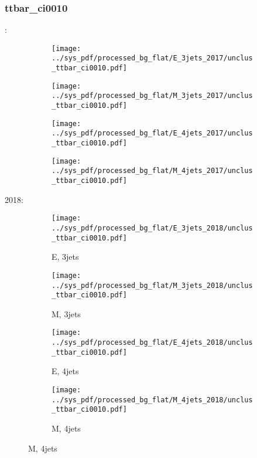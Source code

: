 \documentclass{beamer}
\begin{document}
\begin{frame}
\frametitle{ttbar_ci0010}
\fontsize{5}{1}:
\begin{figure}
\centering
\begin{subfigure}[b]{0.24\textwidth}
\texttt{[image: ../sys\_pdf/processed\_bg\_flat/E\_3jets\_2017/unclus\_ttbar\_ci0010.pdf]}
\end{subfigure}
\begin{subfigure}[b]{0.24\textwidth}
\texttt{[image: ../sys\_pdf/processed\_bg\_flat/M\_3jets\_2017/unclus\_ttbar\_ci0010.pdf]}
\end{subfigure}
\begin{subfigure}[b]{0.24\textwidth}
\texttt{[image: ../sys\_pdf/processed\_bg\_flat/E\_4jets\_2017/unclus\_ttbar\_ci0010.pdf]}
\end{subfigure}
\begin{subfigure}[b]{0.24\textwidth}
\texttt{[image: ../sys\_pdf/processed\_bg\_flat/M\_4jets\_2017/unclus\_ttbar\_ci0010.pdf]}
\end{subfigure}
\end{figure}
2018:
\begin{figure}
\centering
\begin{subfigure}[b]{0.24\textwidth}
\texttt{[image: ../sys\_pdf/processed\_bg\_flat/E\_3jets\_2018/unclus\_ttbar\_ci0010.pdf]}
\captionsetup{font=tiny}
\caption{E, 3jets}
\end{subfigure}
\begin{subfigure}[b]{0.24\textwidth}
\texttt{[image: ../sys\_pdf/processed\_bg\_flat/M\_3jets\_2018/unclus\_ttbar\_ci0010.pdf]}
\captionsetup{font=tiny}
\caption{M, 3jets}
\end{subfigure}
\begin{subfigure}[b]{0.24\textwidth}
\texttt{[image: ../sys\_pdf/processed\_bg\_flat/E\_4jets\_2018/unclus\_ttbar\_ci0010.pdf]}
\captionsetup{font=tiny}
\caption{E, 4jets}
\end{subfigure}
\begin{subfigure}[b]{0.24\textwidth}
\texttt{[image: ../sys\_pdf/processed\_bg\_flat/M\_4jets\_2018/unclus\_ttbar\_ci0010.pdf]}
\captionsetup{font=tiny}
\caption{M, 4jets}
\end{subfigure}
\end{figure}
\end{frame}
\end{document}
